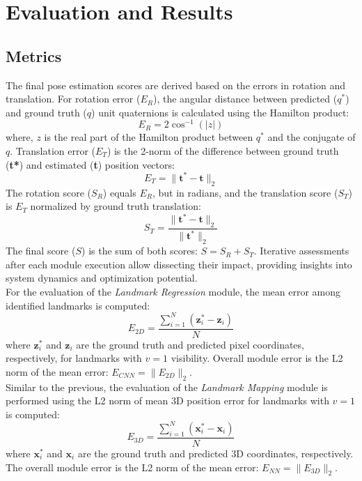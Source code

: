 \documentclass[conference]{IEEEtran}
\begin{document}
\section{Evaluation and Results}
\subsection{Metrics}
The final pose estimation scores are derived based on the errors in rotation and translation. For rotation error ($E_R$), the angular distance between predicted ($q^*$) and ground truth ($q$) unit quaternions is calculated using the Hamilton product:
\[ E_R = 2\cos^{-1}(|z|) \]
where, $z$ is the real part of the Hamilton product between $q^*$ and the conjugate of $q$. Translation error ($E_T$) is the 2-norm of the difference between ground truth (\textbf{t*}) and estimated (\textbf{t}) position vectors:
\[ E_T = \|\textbf{t}^*-\textbf{t}\|_2 \]
The rotation score ($S_R$) equals $E_R$, but in radians, and the translation score ($S_T$) is $E_T$ normalized by ground truth translation:
\[ S_T = \frac{\|\textbf{t}^*-\textbf{t}\|_2}{\|\textbf{t}^*\|_2} \]
The final score ($S$) is the sum of both scores: $S = S_R + S_T$. Iterative assessments after each module execution allow dissecting their impact, providing insights into system dynamics and optimization potential.\\
For the evaluation of the \textit{Landmark Regression} module, the mean error among identified landmarks is computed:
\[ E_{2D} = \frac{\sum_{i=1}^{N} (\textbf{z}^{*}_{i}-\textbf{z}_i)}{N} \]
where $\textbf{z}_{i}^{*}$ and $\textbf{z}_{i}$ are the ground truth and predicted pixel coordinates, respectively, for landmarks with $v=1$ visibility. Overall module error is the L2 norm of the mean error: $E_{CNN} = \|E_{2D}\|_2$.\\
Similar to the previous, the evaluation of the \textit{Landmark Mapping} module is performed using the L2 norm of mean 3D position error for landmarks with $v = 1$ is computed:
\[ E_{3D} = \frac{\sum_{i=1}^{N} (\textbf{x}^{*}_{i}-\textbf{x}_i)}{N} \]
where $\textbf{x}^{*}_{i}$ and $\textbf{x}_i$ are the ground truth and predicted 3D coordinates, respectively. The overall module error is the L2 norm of the mean error: $E_{NN} = \|E_{3D}\|_2$.
\end{document}
